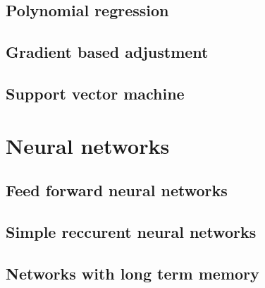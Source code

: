 \subsection{Polynomial regression}

\subsection{Gradient based adjustment}

\subsection{Support vector machine}


\section{Neural networks}

\subsection{Feed forward neural networks}

\subsection{Simple reccurent neural networks}

\subsection{Networks with long term memory}

